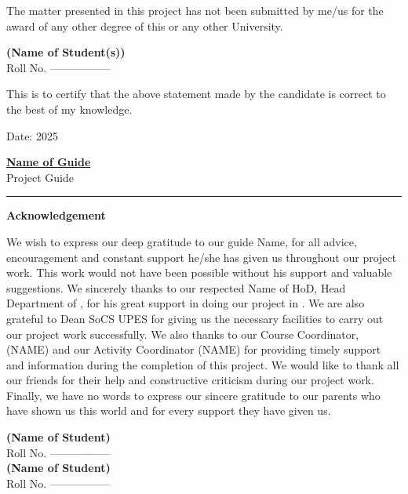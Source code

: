 \documentclass[a4paper,12pt]{report}
\begin{document}
\vspace{1cm}

The matter presented in this project has not been submitted by me/us for the award of any other degree of this or any other University.

\vspace{1.5cm}

\begin{flushright}
    \textbf{(Name of Student(s))} \\
    Roll No. -----------------
\end{flushright}

\vspace{1.5cm}

This is to certify that the above statement made by the candidate is correct to the best of my knowledge.

\vspace{3cm}

\noindent
Date: \underline{\hspace{3cm}} 2025
\hfill
\begin{minipage}{5cm}
    \centering
    \textbf{\underline{Name of Guide}}\\
    Project Guide
\end{minipage}

\vspace{7cm}
\hrule

\begin{center}
    \Large \textbf{Acknowledgement}
\end{center}


We wish to express our deep gratitude to our guide Name, for all advice, encouragement and constant support he/she has given us throughout our project work. This work would not have been possible without his support and valuable suggestions.
We sincerely thanks to our respected Name of HoD, Head Department of \underline{\hspace{3cm}}, for his great support in doing our project in \underline{\hspace{3cm}}.
We are also grateful to Dean SoCS UPES for giving us the necessary facilities to carry out our project work successfully. We also thanks to our Course Coordinator, (NAME) and our Activity Coordinator (NAME) for providing timely support and information during the completion of this project. 
We would like to thank all our friends for their help and constructive criticism during our project work. Finally, we have no words to express our sincere gratitude to our parents who have shown us this world and for every support they have given us.
\vspace{3cm}
\begin{flushright}
    \textbf{(Name of Student)} \\\vspace{1cm}
    Roll No. -----------------\\ \vspace{2cm}
     \textbf{(Name of Student)} \\\vspace{1cm}
    Roll No. -----------------
\end{flushright}
\end{document}
